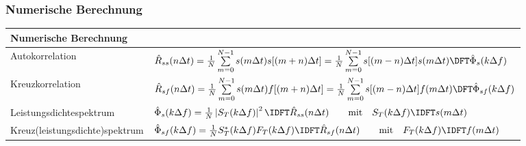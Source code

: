 \subsubsection{Numerische Berechnung}
\begin{tabular}{|l|l|}
    \hline
		\multicolumn{2}{|l|}{\textbf{Numerische Berechnung}} \\
    \hline
    Autokorrelation
        & $\hat{R}_{ss} (n \Delta t) = \frac 1 N \sum\limits_{m=0}^{N-1} s(m \Delta t) s[(m+n) \Delta t] 
                                     = \frac 1 N \sum\limits_{m=0}^{N-1} s[(m-n) \Delta t] s(m \Delta t) \DFT \hat{\Phi}_{s}(k \Delta f)$ \\
    \hline
    Kreuzkorrelation
        & $\hat{R}_{sf} (n \Delta t) = \frac 1 N \sum\limits_{m=0}^{N-1} s(m \Delta t) f[(m+n) \Delta t] 
                                     = \frac 1 N \sum\limits_{m=0}^{N-1} s[(m-n) \Delta t] f(m \Delta t) \DFT \hat{\Phi}_{sf}(k \Delta f) $ \\
    \hline
    Leistungsdichtespektrum 
        & $\hat\Phi_s(k \Delta f) = \frac 1N \left|S_T(k\Delta f)\right|^2 \IDFT \hat{R}_{ss} (n \Delta t)
            \qquad \text{mit} \quad S_T(k\Delta f) \IDFT s(m \Delta t)$\\
    \hline
    Kreuz(leistungsdichte)spektrum 
        & $\hat\Phi_{sf}(k \Delta f) = \frac 1N S_T^*(k\Delta f) F_T(k \Delta f) \IDFT \hat{R}_{sf} (n \Delta t)
        \qquad \text{mit} \quad F_T(k\Delta f) \IDFT f(m \Delta t)$\\
				
    \hline
\end{tabular}